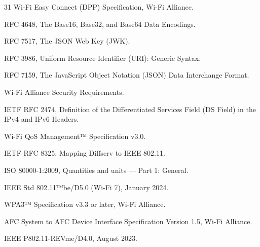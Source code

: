 \begin{thebibliography}{31}
	Wi-Fi Easy Connect (DPP) Specification, Wi-Fi Alliance.
	
	RFC 4648, The Base16, Base32, and Base64 Data Encodings.
	
	RFC 7517, The JSON Web Key (JWK).
	
	RFC 3986, Uniform Resource Identifier (URI): Generic Syntax.
	
	RFC 7159, The JavaScript Object Notation (JSON) Data Interchange Format.
	
	Wi-Fi Alliance Security Requirements.
	
	IETF RFC 2474, Definition of the Differentiated Services Field (DS Field) in the IPv4 and IPv6 Headers.
	
	Wi-Fi QoS Management™ Specification v3.0.
	
	IETF RFC 8325, Mapping Diffserv to IEEE 802.11.
	
	ISO 80000-1:2009, Quantities and units — Part 1: General.
	
	IEEE Std 802.11™be/D5.0 (Wi-Fi 7), January 2024.
	
	WPA3™ Specification v3.3 or later, Wi-Fi Alliance.
	
	AFC System to AFC Device Interface Specification Version 1.5, Wi-Fi Alliance.
	
	IEEE P802.11-REVme/D4.0, August 2023.
	
\end{thebibliography}
